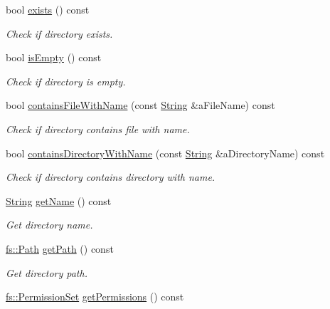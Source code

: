 \begin{DoxyCompactItemize}
bool \hyperlink{classlibrary_1_1core_1_1fs_1_1_directory_a1625670c9b94125ee6965ba8bce848fd}{exists} () const
\begin{DoxyCompactList}\small\item\em Check if directory exists. \end{DoxyCompactList}\item 
bool \hyperlink{classlibrary_1_1core_1_1fs_1_1_directory_af664c462ccd42a31c670c0304597c74a}{is\+Empty} () const
\begin{DoxyCompactList}\small\item\em Check if directory is empty. \end{DoxyCompactList}\item 
bool \hyperlink{classlibrary_1_1core_1_1fs_1_1_directory_aa4e066fe1523c866fd1e7b7b82ad66f5}{contains\+File\+With\+Name} (const \hyperlink{classlibrary_1_1core_1_1types_1_1_string}{String} \&a\+File\+Name) const
\begin{DoxyCompactList}\small\item\em Check if directory contains file with name. \end{DoxyCompactList}\item 
bool \hyperlink{classlibrary_1_1core_1_1fs_1_1_directory_a8e669f2db69416126d2f7076bdf31e33}{contains\+Directory\+With\+Name} (const \hyperlink{classlibrary_1_1core_1_1types_1_1_string}{String} \&a\+Directory\+Name) const
\begin{DoxyCompactList}\small\item\em Check if directory contains directory with name. \end{DoxyCompactList}\item 
\hyperlink{classlibrary_1_1core_1_1types_1_1_string}{String} \hyperlink{classlibrary_1_1core_1_1fs_1_1_directory_a7c21b35bbdc6306d9b98cdd220515619}{get\+Name} () const
\begin{DoxyCompactList}\small\item\em Get directory name. \end{DoxyCompactList}\item 
\hyperlink{classlibrary_1_1core_1_1fs_1_1_path}{fs\+::\+Path} \hyperlink{classlibrary_1_1core_1_1fs_1_1_directory_a94b153cbebbcc5ac6db64ec3aee63901}{get\+Path} () const
\begin{DoxyCompactList}\small\item\em Get directory path. \end{DoxyCompactList}\item 
\hyperlink{classlibrary_1_1core_1_1fs_1_1_permission_set}{fs\+::\+Permission\+Set} \hyperlink{classlibrary_1_1core_1_1fs_1_1_directory_a2214a988c6a3d2b168768d83dfa17225}{get\+Permissions} () const

\end{DoxyCompactItemize}
